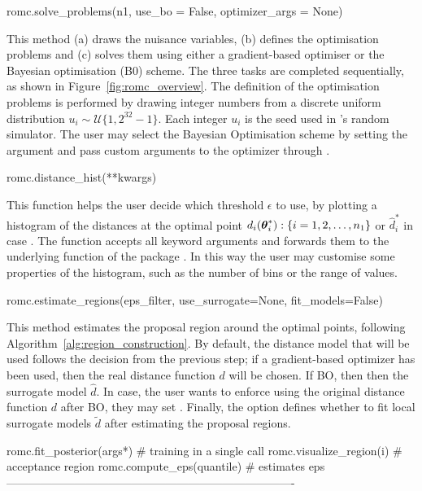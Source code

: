 \begin{Code}
romc.solve_problems(n1, use_bo = False, optimizer_args = None)
\end{Code}

\noindent
This method (a) draws the nuisance variables, (b) defines the
optimisation problems and (c) solves them using either a
gradient-based optimiser or the Bayesian optimisation (B0) scheme. The
three tasks are completed sequentially, as shown in
Figure~\ref{fig:romc_overview}. The definition of the optimisation
problems is performed by drawing  integer numbers from a
discrete uniform distribution \(u_i \sim \mathcal{U}\{1,
2^{32}-1\}\). Each integer \(u_i\) is the seed used in 's
random simulator. The user may select the Bayesian Optimisation scheme
by setting the argument  and pass custom arguments
to the optimizer through .

\begin{Code}
romc.distance_hist(**kwargs)
\end{Code}

\noindent
This function helps the user decide which threshold \(\epsilon\) to
use, by plotting a histogram of the distances at the optimal point
\(d_i(\boldsymbol{\theta}_i^*) : \{i = 1, 2, \ldots, n_1\}\) or \(\hat{d}_i^*\) in
case . The function accepts all keyword arguments
and forwards them to the underlying  function of
the package . In this way the user may customise some
properties of the histogram, such as the number of bins or the range
of values.

\begin{Code}
romc.estimate_regions(eps_filter, use_surrogate=None, fit_models=False)
\end{Code}

\noindent
This method estimates the proposal region around the optimal points,
following Algorithm~\ref{alg:region_construction}. By default, the
distance model that will be used follows the decision from the
previous step; if a gradient-based optimizer has been used, then the
real distance function \(d\) will be chosen. If BO, then then the
surrogate model \(\hat{d}\). In case, the user wants to enforce using
the original distance function \(d\) after BO, they may set
. Finally, the option 
defines whether to fit local surrogate models \(\tilde{d}\) after
estimating the proposal regions.

\begin{Code}
romc.fit_posterior(args*)  # training in a single call
romc.visualize_region(i)   # acceptance region
romc.compute_eps(quantile) # estimates eps
----------------------------------------------------------------------------
\end{Code}

